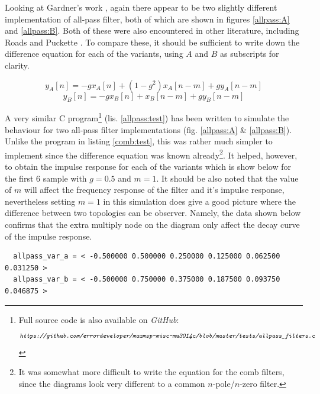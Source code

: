 \documentclass[12pt]{report}
\newcommand{\URL}[1]{\[ \texttt{\emph{#1}} \]}
\newcommand{\href}[2]{#2 (\texttt{\emph{\url{#1}}})} %
\newcommand{\Href}[2]{{#2}} %
\newcommand{\Href}[2]{\href{#1}{#2}} %
\newcommand{\URL}[1]{\[ \Href{#1}{\texttt{\emph{#1}}} \]}
\begin{document}
  Looking at Gardner's work \cite{gardner1998algorithms, gardner1992virtual},
  again there appear to be two slightly different implementation of all-pass
  filter, both of which are shown in figures \ref{allpass:A} and \ref{allpass:B}.
  Both of these were also encountered in other literature, including Roads
  \cite{roads1996computer} and Puckette \cite{puckette2007theory}. To compare
  these, it should be sufficient to write down the difference equation for
  each of the variants, using $A$ and $B$ as subscripts for clarity.

  \begin{equation}\label{eq:ayAn}
    y_A[n] = -gx_A[n] +(1-g^2)x_A[n-m] +gy_A[n-m]
  \end{equation}
  \begin{equation}\label{eq:ayBn}
    y_B[n] = -gx_B[n] +x_B[n-m] +gy_B[n-m]
  \end{equation}

  A very similar C program\footnote{Full source code is also available on \emph{GitHub}:
  \URL{https://github.com/errordeveloper/maxmsp-misc-mu3014c/blob/master/tests/allpass\_filters.c}}
  (lis. \ref{allpass:test}) has been written to simulate the behaviour for two all-pass
  filter implementations (fig. \ref{allpass:A} \& \ref{allpass:B}). Unlike the program
  in listing \ref{comb:test}, this was rather much simpler to implement since
  the difference equation was known already\footnote{It was somewhat more
  difficult to write the equation for the comb filters, since the diagrams
  look very different to a common $n$-pole/$n$-zero filter.}. It helped,
  however, to obtain the impulse response for each of the variants which is
  show below for the first 6 sample with $g=0.5$ and $m=1$. It should be also
  noted that the value of $m$ will affect the frequency response of the filter
  and it's impulse response, nevertheless setting $m=1$ in this simulation
  does give a good picture where the difference between two topologies can be
  observer. Namely, the data shown below confirms that the extra multiply node
  on the diagram only affect the decay curve of the impulse response.
  \begin{verbatim}
  allpass_var_a = < -0.500000 0.500000 0.250000 0.125000 0.062500 0.031250 >
  allpass_var_b = < -0.500000 0.750000 0.375000 0.187500 0.093750 0.046875 >
  \end{verbatim}
\end{document}
